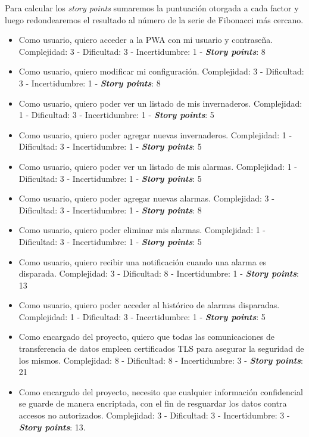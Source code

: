 \documentclass[
11pt, %
]{charter}
\begin{document}
Para calcular los \textit{story points} sumaremos la puntuación otorgada a cada factor y luego redondearemos el resultado al número de la serie de Fibonacci más cercano.


\begin{itemize}
	\item Como usuario, quiero acceder a la PWA con mi usuario y contraseña. Complejidad: 3 - Dificultad: 3 - Incertidumbre: 1 - \textbf{\textit{Story points}}: 8
	\item Como usuario, quiero modificar mi configuración. Complejidad: 3 - Dificultad: 3 - Incertidumbre: 1 - \textbf{\textit{Story points}}: 8
	\item Como usuario, quiero poder ver un listado de mis invernaderos. Complejidad: 1 - Dificultad: 3 - Incertidumbre: 1 - \textbf{\textit{Story points}}: 5
	\item Como usuario, quiero poder agregar nuevas invernaderos. Complejidad: 1 - Dificultad: 3 - Incertidumbre: 1 - \textbf{\textit{Story points}}: 5
	\item Como usuario, quiero poder ver un listado de mis alarmas. Complejidad: 1 - Dificultad: 3 - Incertidumbre: 1 - \textbf{\textit{Story points}}: 5
	\item Como usuario, quiero poder agregar nuevas alarmas. Complejidad: 3 - Dificultad: 3 - Incertidumbre: 1 - \textbf{\textit{Story points}}: 8
	\item Como usuario, quiero poder eliminar mis alarmas. Complejidad: 1 - Dificultad: 3 - Incertidumbre: 1 - \textbf{\textit{Story points}}: 5
	\item Como usuario, quiero recibir una notificación cuando una alarma es disparada. Complejidad: 3 - Dificultad: 8 - Incertidumbre: 1 - \textbf{\textit{Story points}}: 13
	\item Como usuario, quiero poder acceder al histórico de alarmas disparadas. Complejidad: 1 - Dificultad: 3 - Incertidumbre: 1 - \textbf{\textit{Story points}}: 5
	\item Como encargado del proyecto, quiero que todas las comunicaciones de transferencia de datos empleen certificados TLS para asegurar la seguridad de los mismos. Complejidad: 8 - Dificultad: 8 - Incertidumbre: 3 - \textbf{\textit{Story points}}: 21
	\item Como encargado del proyecto, necesito que cualquier información confidencial se guarde de manera encriptada, con el fin de resguardar los datos contra accesos no autorizados. Complejidad: 3 - Dificultad: 3 - Incertidumbre: 3 - \textbf{\textit{Story points}}: 13.
\end{itemize}
\end{document}
